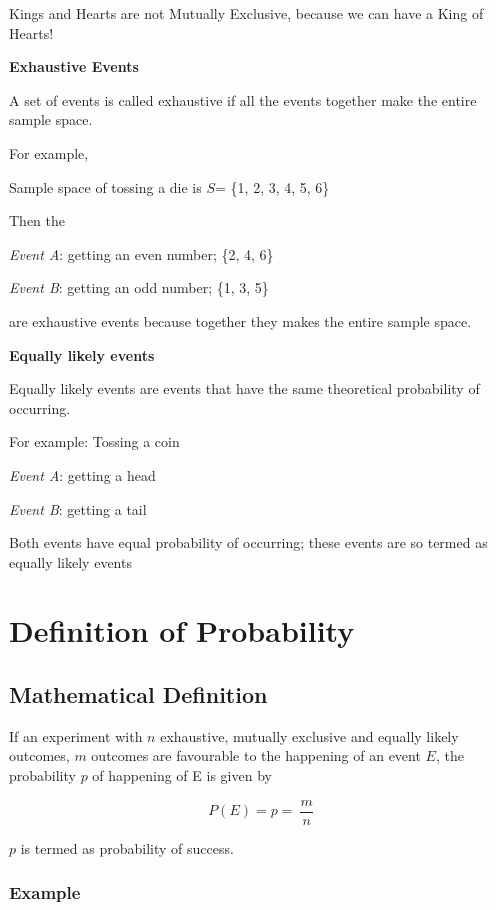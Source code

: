 \documentclass[
]{book}
\begin{document}
Kings and Hearts are not Mutually Exclusive, because we can have a King of Hearts!

\textbf{Exhaustive Events}

A set of events is called exhaustive if all the events together make the
entire sample space.

For example,

Sample space of tossing a die is \(S\)= \{1, 2, 3, 4, 5, 6\}

Then the

\emph{Event A}: getting an even number; \{2, 4, 6\}

\emph{Event B}: getting an odd number; \{1, 3, 5\}

are exhaustive events because together they makes the entire sample space.

\textbf{Equally likely events}

Equally likely events are events that have the same theoretical
probability of occurring.

For example: Tossing a coin

\emph{Event A}: getting a head

\emph{Event B}: getting a tail

Both events have equal probability of occurring; these events are so termed as equally likely events

\hypertarget{definition-of-probability}{%
\section{Definition of Probability}\label{definition-of-probability}}

\hypertarget{mathematical-definition}{%
\subsection{Mathematical Definition}\label{mathematical-definition}}

If an experiment with \(n\) exhaustive, mutually exclusive and equally likely outcomes, \(m\) outcomes are favourable to the happening of an event \(E\), the probability \(p\) of happening of E is given by

\[P\left( E \right) = p = \ \frac{m}{n}\]

\(p\) is termed as probability of success.

\hypertarget{example-3}{%
\subsubsection*{Example}\label{example-3}}
\end{document}
